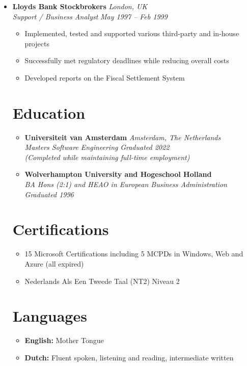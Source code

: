 \documentclass[11pt,a4paper]{article}
\begin{document}
\begin{itemize}[leftmargin=0pt,label={},itemsep=2em]
\item \textbf{Lloyds Bank Stockbrokers} \hfill \textit{London, UK}\\[2pt]
\textit{Support / Business Analyst} \hfill \textit{May 1997 -- Feb 1999}\\[1pt]
\begin{itemize}[leftmargin=*,topsep=0pt,parsep=0pt,partopsep=0pt]
    \item Implemented, tested and supported various third-party and in-house projects
    \item Successfully met regulatory deadlines while reducing overall costs
    \item Developed reports on the Fiscal Settlement System
\end{itemize}

\section{Education}
\begin{itemize}[leftmargin=0pt,label={},itemsep=2em]
\item \textbf{Universiteit van Amsterdam} \hfill \textit{Amsterdam, The Netherlands}\\
\textit{Masters Software Engineering} \hfill \textit{Graduated 2022}\\
\textit{(Completed while maintaining full-time employment)}

\item \textbf{Wolverhampton University and Hogeschool Holland}\\
\textit{BA Hons (2:1) and HEAO in European Business Administration} \hfill \textit{Graduated 1996}
\end{itemize}

\section{Certifications}
\begin{itemize}[leftmargin=*]
\item 15 Microsoft Certifications including 5 MCPDs in Windows, Web and Azure (all expired)
\item Nederlands Als Een Tweede Taal (NT2) Niveau 2
\end{itemize}

\section{Languages}
\begin{itemize}[leftmargin=*]
\item \textbf{English:} Mother Tongue
\item \textbf{Dutch:} Fluent spoken, listening and reading, intermediate written
\end{itemize}

\end{itemize}
\end{document}
